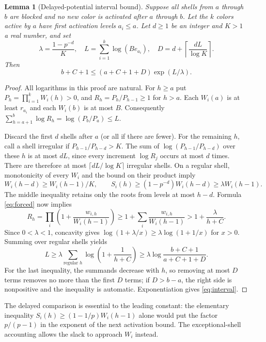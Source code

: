 \documentclass[11pt]{article}
\newtheorem{lemma}[theorem]{Lemma}
\theoremstyle{remark}\newtheorem{remark}[theorem]{Remark}
\begin{document}
\begin{lemma}[Delayed-potential interval bound]\label{lem:interval}
Suppose all shells from $a$ through $b$ are blocked and no new color is activated after $a$ through $b$. Let the $k$ colors active by $a$ have first activation levels $a_i\le a$. Let $d\ge1$ be an integer and $K>1$ a real number, and set
\[
 \lambda=\frac{1-p^{-d}}K,\quad L=\sum_{i=1}^k\log(B e_{a_i}),\quad
 D=d+\left\lceil\frac{dL}{\log K}\right\rceil.
\]
Then
\begin{equation}\label{eq:interval}
 b+C+1\le (a+C+1+D)\exp(L/\lambda).
\end{equation}
\end{lemma}
\begin{proof}
All logarithms in this proof are natural. For $h\ge a$ put $P_h=\prod_{i=1}^k W_i(h)>0$, and $R_h=P_h/P_{h-1}\ge1$ for $h>a$. Each $W_i(a)$ is at least $r_{a_i}$ and each $W_i(b)$ is at most $B$. Consequently $\sum_{h=a+1}^b\log R_h=\log(P_b/P_a)\le L$.

Discard the first $d$ shells after $a$ (or all if there are fewer). For the remaining $h$, call a shell irregular if $P_{h-1}/P_{h-d}>K$. The sum of $\log(P_{h-1}/P_{h-d})$ over these $h$ is at most $dL$, since every increment $\log R_j$ occurs at most $d$ times. There are therefore at most $\lceil dL/\log K\rceil$ irregular shells. On a regular shell, monotonicity of every $W_i$ and the bound on their product imply
\[
 W_i(h-d)\ge W_i(h-1)/K,
 \qquad S_i(h)\ge(1-p^{-d})W_i(h-d)\ge\lambda W_i(h-1).
\]
The middle inequality retains only the roots from levels at most $h-d$. Formula \eqref{eq:forced} now implies
\[
 R_h=\prod_i\left(1+\frac{w_{i,h}}{W_i(h-1)}\right)
 \ge 1+\sum_i\frac{w_{i,h}}{W_i(h-1)} > 1+\frac\lambda{h+C}.
\]
Since $0<\lambda<1$, concavity gives $\log(1+\lambda/x)\ge\lambda\log(1+1/x)$ for $x>0$. Summing over regular shells yields
\[
 L\ge\lambda\sum_{\text{regular }h}\log\left(1+\frac1{h+C}\right)
 \ge\lambda\log\frac{b+C+1}{a+C+1+D}.
\]
For the last inequality, the summands decrease with $h$, so removing at most $D$ terms removes no more than the first $D$ terms; if $D>b-a$, the right side is nonpositive and the inequality is automatic. Exponentiation gives \eqref{eq:interval}.
\end{proof}

The delayed comparison is essential to the leading constant: the elementary inequality $S_i(h)\ge(1-1/p)W_i(h-1)$ alone would put the factor $p/(p-1)$ in the exponent of the next activation bound. The exceptional-shell accounting allows the slack to approach $W_i$ instead.
\end{document}
